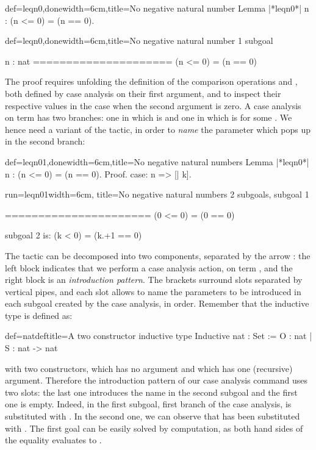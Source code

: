 \begin{coq}{def=leqn0,done}{width=6cm,title=No negative natural number}
Lemma |*leqn0*| n : (n <= 0) = (n == 0).
\end{coq}
\begin{coqout}{def=leqn0,done}{width=6cm,title=No negative natural
    number}
1 subgoal

n : nat
=====================
  (n <= 0) = (n == 0)
\end{coqout}

The proof requires unfolding the definition of the comparison operations
\C{<=} and \C{==}, both defined by case analysis on their first
argument, and to inspect their respective values in the case when the
second argument is zero. A case analysis on term  has two
branches: one in which  is  and one in which  is
 for some . We hence need a variant of the 
tactic, in order to \emph{name} the parameter  which pops up in
the second branch:
\begin{coq}{def=leqn01,done}{width=6cm,title=No negative natural numbers}
Lemma |*leqn0*| n : (n <= 0) = (n == 0).
Proof.
case: n => [| k].
\end{coq}
\begin{coqout}{run=leqn01}{width=6cm, title=No negative natural numbers}
2 subgoals, subgoal 1

======================
  (0 <= 0) = (0 == 0)

subgoal 2 is:
 (k < 0) = (k.+1 == 0)
\end{coqout}
The tactic   can be decomposed into two components,
separated by the arrow \C{=>}: the left block  indicates
that we  perform a case analysis action, on term , and the right
block \C{[|k]} is an \emph{introduction pattern}. The brackets
surround slots separated by vertical pipes, and each slot allows to
name the parameters to be introduced in each subgoal created by the
case analysis, in order. Remember that the inductive type  is
defined as:
\begin{coq}{def=natdef}{title=A two constructor inductive type}
Inductive nat : Set :=  O : nat | S : nat -> nat
\end{coq}
with two constructors,  which has no argument and  which has
one (recursive) argument. Therefore the introduction pattern \C{[|k]}
of our case analysis command uses two slots: the last one introduces
the name  in the second subgoal and the first one is
empty. Indeed, in the first subgoal, first branch of the case
analysis,  is substituted with . In the second one, we can
observe that  has been substituted with . The first goal
can be easily solved by computation, as both hand sides of the equality
evaluates to . 

